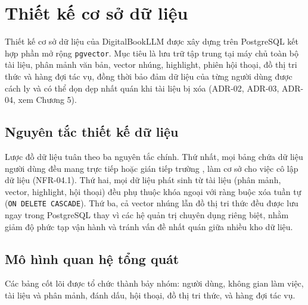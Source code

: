 \section{Thiết kế cơ sở dữ liệu}
Thiết kế cơ sở dữ liệu của DigitalBookLLM được xây dựng trên PostgreSQL kết hợp phần mở rộng \texttt{pgvector}. Mục tiêu là lưu trữ tập trung tại máy chủ toàn bộ tài liệu, phân mảnh văn bản, vector nhúng, highlight, phiên hội thoại, đồ thị tri thức và hàng đợi tác vụ, đồng thời bảo đảm dữ liệu của từng người dùng được cách ly và có thể dọn dẹp nhất quán khi tài liệu bị xóa (ADR-02, ADR-03, ADR-04, xem Chương 5).

\subsection{Nguyên tắc thiết kế dữ liệu}
Lược đồ dữ liệu tuân theo ba nguyên tắc chính. Thứ nhất, mọi bảng chứa dữ liệu người dùng đều mang trực tiếp hoặc gián tiếp trường , làm cơ sở cho việc cô lập dữ liệu (NFR-04.1). Thứ hai, mọi dữ liệu phát sinh từ tài liệu (phân mảnh, vector, highlight, hội thoại) đều phụ thuộc khóa ngoại với ràng buộc xóa tuần tự (\texttt{ON DELETE CASCADE}). Thứ ba, cả vector nhúng lẫn đồ thị tri thức đều được lưu ngay trong PostgreSQL thay vì các hệ quản trị chuyên dụng riêng biệt, nhằm giảm độ phức tạp vận hành và tránh vấn đề nhất quán giữa nhiều kho dữ liệu.

\subsection{Mô hình quan hệ tổng quát}
Các bảng cốt lõi được tổ chức thành bảy nhóm: người dùng, không gian làm việc, tài liệu và phân mảnh, đánh dấu, hội thoại, đồ thị tri thức, và hàng đợi tác vụ.

